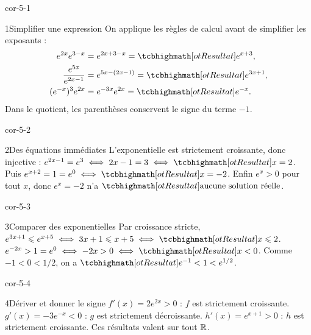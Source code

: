 \corrigesSouples

\begin{blocLivre}{cor-5-1}
\begin{corrige}{1}{Simplifier une expression}
On applique les règles de calcul avant de simplifier les exposants :
\begin{align*}
e^{2x}e^{3-x}&=e^{2x+3-x}=\res{e^{x+3}},\\
\frac{e^{5x}}{e^{2x-1}}&=e^{5x-(2x-1)}=\res{e^{3x+1}},\\
(e^{-x})^3e^{2x}&=e^{-3x}e^{2x}=\res{e^{-x}}.
\end{align*}
Dans le quotient, les parenthèses conservent le signe du terme $-1$.

\end{corrige}
\end{blocLivre}
\begin{blocLivre}{cor-5-2}
\begin{corrige}{2}{Des équations immédiates}
L'exponentielle est strictement croissante, donc injective :
$e^{2x-1}=e^3\iff2x-1=3\iff\res{x=2}$.
Puis $e^{x+2}=1=e^0\iff\res{x=-2}$.
Enfin $e^x>0$ pour tout $x$, donc $e^x=-2$ n'a $\res{\text{aucune solution réelle}}$.
\end{corrige}
\end{blocLivre}
\begin{blocLivre}{cor-5-3}
\begin{corrige}{3}{Comparer des exponentielles}
Par croissance stricte, $e^{3x+1}\leq e^{x+5}\iff3x+1\leq x+5\iff\res{x\leq2}$.
$e^{-2x}>1=e^0\iff-2x>0\iff\res{x<0}$.
Comme $-1<0<1/2$, on a $\res{e^{-1}<1<e^{1/2}}$.
\end{corrige}
\end{blocLivre}
\begin{blocLivre}{cor-5-4}
\begin{corrige}{4}{Dériver et donner le signe}
$f'(x)=2e^{2x}>0$ : $f$ est strictement croissante.
$g'(x)=-3e^{-x}<0$ : $g$ est strictement décroissante.
$h'(x)=e^{x+1}>0$ : $h$ est strictement croissante.
Ces résultats valent sur tout $\mathbb{R}$.
\end{corrige}
\end{blocLivre}
